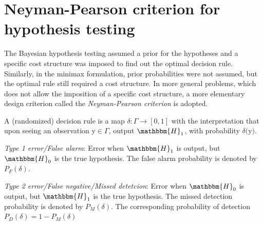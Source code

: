 \documentclass[12pt]{report}
\begin{document}
\maketitle




\section{Neyman-Pearson criterion for hypothesis testing}
The Bayesian hypothesis testing assumed a prior for the hypotheses and a specific cost structure was imposed to find out the optimal decision rule. Similarly, in the minimax formulation, prior probabilities were not assumed, but the optimal rule still required a cost structure. In more general problems, which does not allow the imposition of a specific cost structure, a more elementary design criterion called the {\itshape Neyman-Pearson criterion} is adopted.\\


\begin{defn}
 A (randomized) decision rule is a map $ \delta \colon \Gamma \rightarrow [0,1]$
with the interpretation that upon seeing an observation $ $y$\in \Gamma $, output $\mathbbm{H}_1$, with probability $\delta($y$)$.\\
\end{defn}


\begin{defn}
{\itshape Type 1 error/False alarm}: Error when $\mathbbm{H}_1$ is output, but $\mathbbm{H}_0$ is the true hypothesis. The false alarm probability is denoted by $P_F(\delta)$.\\
\end{defn}



\begin{defn}
{\itshape Type 2 error/False negative/Missed detetcion}: Error when $\mathbbm{H}_0$ is output, but $\mathbbm{H}_1$ is the true hypothesis. The missed detection probability is denoted by $P_M(\delta)$. The corresponding probability of detection $P_D(\delta)=1-P_M(\delta)$\\
\end{defn}
\end{document}
